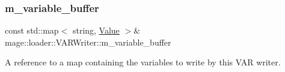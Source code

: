 \subsubsection{\texorpdfstring{m\+\_\+variable\+\_\+buffer}{m\_variable\_buffer}}
{\footnotesize\ttfamily const std\+::map$<$ string, \mbox{\hyperlink{namespacemage_aa1fe0628487e0706e44efdc62dbdb3a2}{Value}} $>$\& mage\+::loader\+::\+V\+A\+R\+Writer\+::m\+\_\+variable\+\_\+buffer\hspace{0.3cm}{\ttfamily [private]}}

A reference to a map containing the variables to write by this V\+AR writer. 